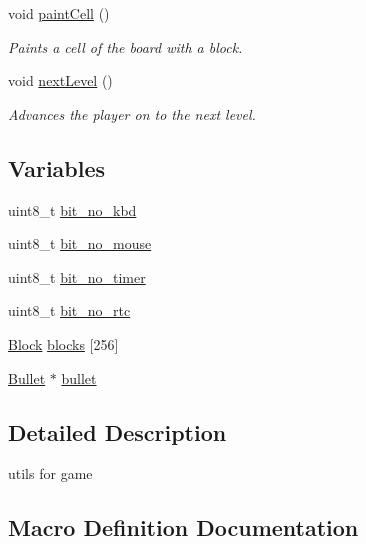 \begin{DoxyCompactItemize}
void \mbox{\hyperlink{group__game_gac9ffb5de47cf14e382f2f7c0f359eb39}{paint\+Cell}} ()
\begin{DoxyCompactList}\small\item\em Paints a cell of the board with a block. \end{DoxyCompactList}\item 
void \mbox{\hyperlink{group__game_gac165fe517b083b5ccd861bf028a67b7e}{next\+Level}} ()
\begin{DoxyCompactList}\small\item\em Advances the player on to the next level. \end{DoxyCompactList}\end{DoxyCompactItemize}
\subsection*{Variables}
\begin{DoxyCompactItemize}
\item 
uint8\+\_\+t \mbox{\hyperlink{group__game_ga6d6813b4ed3fe31a49b13b3cd616beb5}{bit\+\_\+no\+\_\+kbd}}
\item 
uint8\+\_\+t \mbox{\hyperlink{group__game_ga3553354293e11c5cd620f549a9b0125d}{bit\+\_\+no\+\_\+mouse}}
\item 
uint8\+\_\+t \mbox{\hyperlink{group__game_ga4594ebb7bd04d177d6cd263c79326508}{bit\+\_\+no\+\_\+timer}}
\item 
uint8\+\_\+t \mbox{\hyperlink{group__game_ga260e7fab8fc77111f366569f300d9947}{bit\+\_\+no\+\_\+rtc}}
\item 
\mbox{\hyperlink{struct_block}{Block}} \mbox{\hyperlink{group__game_ga20059dbeabda880205889c9dd7da0413}{blocks}} \mbox{[}256\mbox{]}
\item 
\mbox{\hyperlink{struct_bullet}{Bullet}} $\ast$ \mbox{\hyperlink{group__game_gaecc50182d564a1688000de7e0dae0c1a}{bullet}}
\end{DoxyCompactItemize}


\subsection{Detailed Description}
utils for game 

\subsection{Macro Definition Documentation}
\mbox{\label{group__game_ga598a3330b3c21701223ee0ca14316eca}} 

